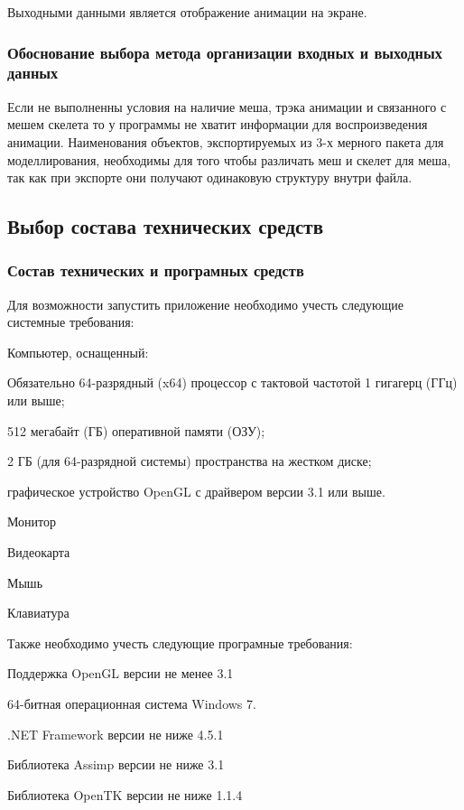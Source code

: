 Выходными данными является отображение анимации на экране.

\subsubsection{Обоснование выбора метода  организации входных и выходных данных}
Если не выполненны условия на наличие меша, трэка анимации и связанного с мешем скелета то у программы не хватит информации для воспроизведения анимации. 
Наименования объектов, экспортируемых из 3-х мерного пакета для моделлирования, необходимы для того чтобы различать меш и скелет для меша, так как при экспорте они получают одинаковую структуру внутри файла.

\subsection{Выбор состава технических средств}

\subsubsection{Состав технических и програмных средств}
Для возможности запустить приложение необходимо учесть следующие системные требования:
\begin{my_enumerate}
\item Компьютер, оснащенный:
    \begin{my_enumerate}
    \item Обязательно 64-разрядный (x64) процессор с тактовой частотой 1 гигагерц (ГГц) или выше;
    \item 512 мегабайт (ГБ) оперативной памяти (ОЗУ);
    \item 2 ГБ (для 64-разрядной системы) пространства на жестком диске;
    \item графическое устройство OpenGL с драйвером версии 3.1 или выше.
    \end{my_enumerate}
\item Монитор
\item Видеокарта
\item Мышь
\item Клавиатура
\end{my_enumerate}

\bigskip

Также необходимо учесть следующие програмные требования:
\begin{my_enumerate}
\item Поддержка OpenGL версии не менее 3.1
\item 64-битная операционная система Windows 7.
\item .NET Framework версии не ниже 4.5.1
\item Библиотека Assimp версии не ниже 3.1 
\item Библиотека OpenTK версии не ниже 1.1.4
\end{my_enumerate}


